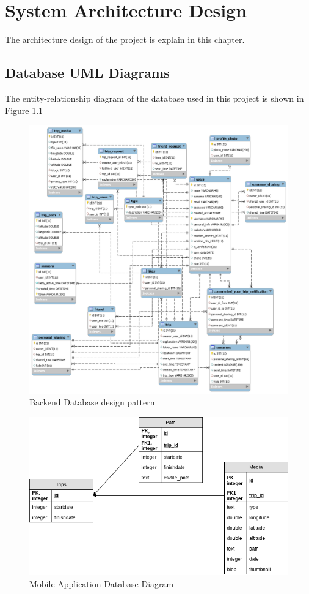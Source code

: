 \chapter{System Architecture Design}
The architecture design of the project is explain in this chapter.

\newpage

\section{Database UML Diagrams}
The entity-relationship diagram of the database used in this project is shown in Figure \ref{fig:dbdesign}
\begin{figure}[!htbp]
\centering
\includegraphics[width=\textwidth]{projectChapters/images/databaseDesign.png}
\caption{Backend Database design
 pattern}
 \label{fig:dbdesign}
\end{figure}
 
\newpage

\begin{figure}[!htbp]
\centering
\includegraphics[width=\textwidth]{projectChapters/images/android_database.png}
\caption{Mobile Application Database Diagram}
\end{figure} 


